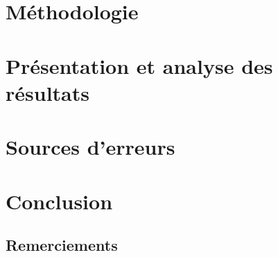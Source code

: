 \documentclass[letterpaper,12pt,oneside]{article}
\begin{document}
\section{Méthodologie}

\section{Présentation et analyse des résultats}

\section{Sources d'erreurs}


\section{Conclusion}


\subsection*{Remerciements}




\pagebreak
\begin{appendices}
 \setcounter{page}{1}
\begin{subappendices}

\end{subappendices}
\end{appendices}
\end{document}
